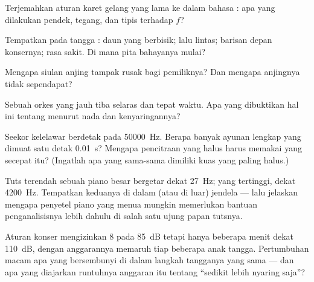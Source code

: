 \begin{exercise}[$\star$]\label{exo:g8:sound-pitch-loudness:5}
Terjemahkan aturan karet gelang yang lama ke dalam bahasa :
apa yang dilakukan pendek, tegang, dan tipis terhadap $f$?
\end{exercise}

\begin{exercise}[$\star$]\label{exo:g8:sound-pitch-loudness:6}
Tempatkan pada tangga : daun yang berbisik; lalu lintas;
barisan depan konsernya; rasa sakit. Di mana pita bahayanya mulai?
\end{exercise}

\begin{exercise}[$\star$]\label{exo:g8:sound-pitch-loudness:7}
Mengapa siulan anjing tampak rusak bagi pemiliknya? Dan mengapa
anjingnya tidak sependapat?
\end{exercise}

\begin{exercise}[$\star$]\label{exo:g8:sound-pitch-loudness:8}
Sebuah orkes yang jauh tiba selaras dan tepat waktu. Apa yang
dibuktikan hal ini tentang   menurut nada dan
kenyaringannya?
\end{exercise}

\begin{exercise}[$\star\star$]\label{exo:g8:sound-pitch-loudness:9}
Seekor kelelawar berdetak pada \qty{50000}{Hz}. Berapa banyak ayunan
lengkap yang dimuat satu detak \qty{0.01}{s}? Mengapa pencitraan 
yang halus harus memakai  yang secepat itu? (Ingatlah apa yang
sama-sama dimiliki kuas yang paling halus.)
\end{exercise}

\begin{exercise}[$\star\star$]\label{exo:g8:sound-pitch-loudness:10}
Tuts terendah sebuah piano besar bergetar dekat \qty{27}{Hz}; yang
tertinggi, dekat \qty{4200}{Hz}. Tempatkan keduanya di dalam (atau di
luar) jendela  --- lalu jelaskan mengapa penyetel piano
yang menua mungkin memerlukan bantuan penganalisisnya lebih dahulu di
salah satu ujung papan tutsnya.
\end{exercise}

\begin{exercise}[$\star\star$]\label{exo:g8:sound-pitch-loudness:11}
Aturan konser mengizinkan $8$  pada \qty{85}{dB} tetapi hanya
beberapa menit dekat \qty{110}{dB}, dengan anggarannya memaruh tiap
beberapa anak tangga. Pertumbuhan macam apa yang bersembunyi di dalam
langkah tangganya yang sama --- dan apa yang diajarkan runtuhnya
anggaran itu tentang ``sedikit lebih nyaring saja''?
\end{exercise}

